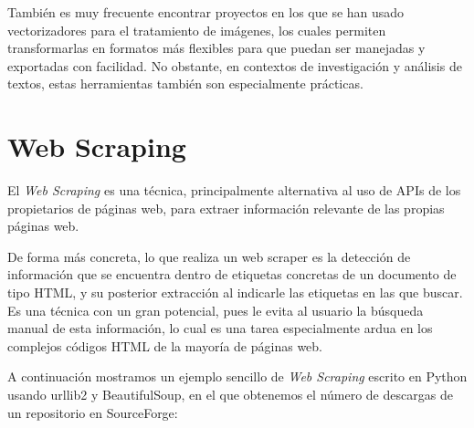 También es muy frecuente encontrar proyectos en los que se han usado vectorizadores para el tratamiento de imágenes, los cuales permiten transformarlas en formatos más flexibles para que puedan ser manejadas y exportadas con facilidad. No obstante, en contextos de investigación y análisis de textos, estas herramientas también son especialmente prácticas.



\section{Web Scraping}

El \emph{Web Scraping} \cite{mitchell2015web} es una técnica, principalmente alternativa al uso de APIs de los propietarios de páginas web, para extraer información relevante de las propias páginas web.

De forma más concreta, lo que realiza un web scraper es la detección de información que se encuentra dentro de etiquetas concretas de un documento de tipo HTML, y su posterior extracción al indicarle las etiquetas en las que buscar. Es una técnica con un gran potencial, pues le evita al usuario la búsqueda manual de esta información, lo cual es una tarea especialmente ardua en los complejos códigos HTML de la mayoría de páginas web. 

A continuación mostramos un ejemplo sencillo de \emph{Web Scraping} escrito en Python usando urllib2 y BeautifulSoup, en el que obtenemos el número de descargas de un repositorio en SourceForge:

